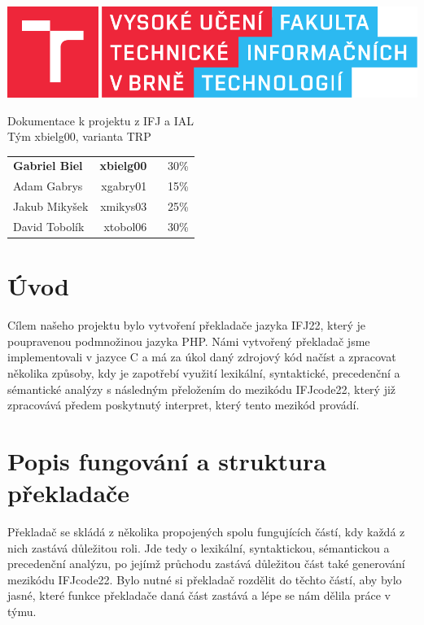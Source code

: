 \documentclass[a4paper, 12pt]{article}
\begin{document}
    \begin{titlepage}
		\centering

        \includegraphics{src/fitlogo.pdf}


        {\Huge Dokumentace k projektu z IFJ a IAL\\[0.4em]
            \LARGE Tým xbielg00, varianta TRP}


        \begin{table}[H]
            \hfill
            \begin{tabularx}{0.5\textwidth}{Xr}
                \textbf{Gabriel Biel} & \textbf{xbielg00 }\ \ \ 30\%\\
                Adam Gabrys & xgabry01  \ \ \ 15\% \\
                Jakub Mikyšek & xmikys03  \ \ \ 25\% \\
                David Tobolík & xtobol06  \ \ \ 30\% \\
            \end{tabularx}
        \end{table}
	\end{titlepage}

    \tableofcontents
    \newpage

    \section{Úvod}
    Cílem našeho projektu bylo vytvoření překladače jazyka IFJ22, který je poupravenou podmnožinou jazyka PHP. Námi vytvořený překladač jsme implementovali v jazyce C a  má za úkol daný zdrojový kód načíst a zpracovat několika způsoby, kdy je zapotřebí využití lexikální, syntaktické, precedenční a sémantické analýzy s následným přeložením do mezikódu IFJcode22, který již zpracovává předem poskytnutý interpret, který tento mezikód provádí.

    \section{Popis fungování a struktura překladače}
    Překladač se skládá z několika propojených spolu fungujících částí, kdy každá z nich zastává důležitou roli. Jde tedy o lexikální, syntaktickou, sémantickou a precedenční analýzu, po jejímž průchodu zastává důležitou část také generování mezikódu IFJcode22. Bylo nutné si překladač rozdělit do těchto částí, aby bylo jasné, které funkce překladače daná část zastává a lépe se nám dělila práce v týmu.
\end{document}
